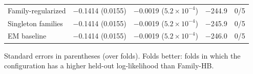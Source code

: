 \begin{table}[htbp]
\begin{tabular}{@{}lcccc@{}}
Family-regularized & $-$0.1414 (0.0155) & $-$0.0019 ($5.2\times 10^{-4}$) & $-$244.9 & 0/5 \\
Singleton families & $-$0.1414 (0.0155) & $-$0.0019 ($5.2\times 10^{-4}$) & $-$245.9 & 0/5 \\
EM baseline & $-$0.1414 (0.0155) & $-$0.0019 ($5.2\times 10^{-4}$) & $-$246.0 & 0/5 \\
\bottomrule
\end{tabular}
\par\smallskip
\begin{minipage}{\linewidth}\footnotesize
Standard errors in parentheses (over folds). Folds better: folds in which the configuration has a higher held-out log-likelihood than Family-HB.
\end{minipage}
\end{table}
